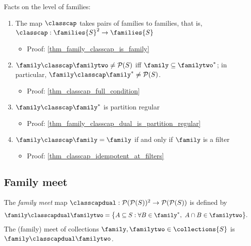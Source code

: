 \vskip0.5cm

Facts on the level of families:
\begin{enumerate}
    \item The map $\classcap$ takes pairs of families to families, that is, $\classcap: \families{S}^2 \to \families{S}$
    \begin{itemize}
        \item Proof: \cref{thm_family_classcap_is_family}
    \end{itemize}

    \item {}  $\family \classcap \familytwo \neq \mathcal{P}(S)$ iff $\family \subseteq \familytwo^*$; in particular, $\family \classcap \family^* \neq \mathcal{P}(S)$.
    \begin{itemize}
        \item Proof: \cref{thm_classcap_full_condition}
    \end{itemize}

    \item $\family \classcap \family^*$ is partition regular
    \begin{itemize}
        \item Proof: \cref{thm_family_classcap_dual_is_partition_regular}
    \end{itemize}

    \item $\family \classcap \family = \family$ if and only if $\family$ is a filter
    \begin{itemize}
        \item Proof: \cref{thm_classcap_idempotent_at_filters}
    \end{itemize}

\end{enumerate}

\subsection{Family meet}

\begin{definition}
     The \emph{family meet} map $\classcapdual: \mathcal{P}(\mathcal{P}(S))^2 \to \mathcal{P}(\mathcal{P}(S))$ is defined by
    \[\family \classcapdual \familytwo = \big\{A \subseteq S : \forall B \in \family^*, \ A \cap B \in \familytwo \big\}.\]
    The (family) meet of collections $\family, \familytwo \in \collections{S}$ is $\family \classcapdual \familytwo$.
\end{definition}

